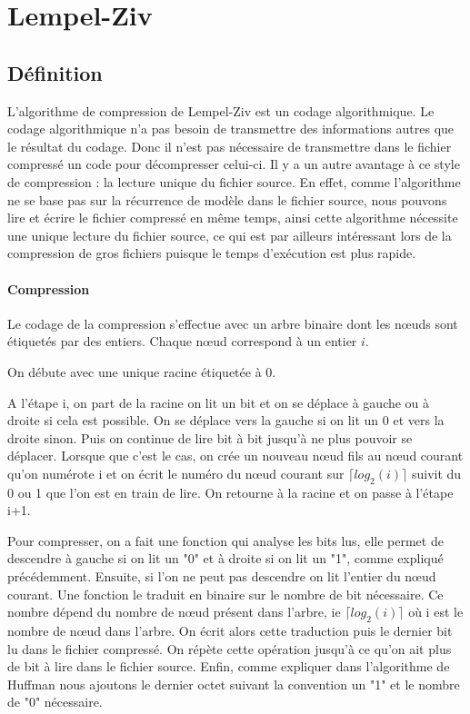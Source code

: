 \documentclass{report}
\begin{document}
\chapter*{Lempel-Ziv}
\section*{Définition }

L'algorithme de compression de Lempel-Ziv est un codage algorithmique.  Le codage algorithmique n’a pas besoin de transmettre des informations autres que le résultat du codage. Donc il n'est pas nécessaire de transmettre dans le fichier compressé un code pour décompresser celui-ci. Il y a un autre avantage à ce style de compression : la lecture unique du fichier source. En effet, comme l'algorithme ne se base pas sur la récurrence de modèle dans le fichier source, nous pouvons lire et écrire le fichier compressé en même temps, ainsi cette algorithme nécessite une unique lecture du fichier source, ce qui est par ailleurs intéressant lors de la compression de gros fichiers puisque le temps d'exécution est plus rapide. 


\subsubsection{Compression}
Le codage de la compression s'effectue avec un arbre binaire dont les nœuds sont étiquetés par des entiers. Chaque nœud correspond à un entier $i$. 

On débute avec une unique racine étiquetée à 0.

A l'étape i, on part de la racine on lit un bit et on se déplace à gauche ou à droite si cela est possible. On se déplace vers la gauche si on lit un 0 et vers la droite sinon. Puis on continue de lire bit à bit jusqu'à ne plus pouvoir se déplacer. Lorsque que c'est le cas, on crée un nouveau nœud fils au nœud courant qu'on numérote i et on écrit le numéro du nœud courant sur $\lceil log_{2}(i) \rceil$ suivit du 0 ou 1 que l'on est en train de lire.
On retourne à la racine et on passe à l'étape i+1.

Pour compresser, on a fait une fonction qui analyse les bits lus, elle permet de descendre à gauche si on lit un "0" et à droite si on lit un "1", comme expliqué précédemment. Ensuite, si l'on ne peut pas descendre on lit l'entier du nœud courant. Une fonction le traduit en binaire sur le nombre de bit nécessaire. Ce nombre dépend du nombre de nœud présent dans l'arbre, ie $\lceil log_{2}(i) \rceil$ où i est le nombre de nœud dans l'arbre. 
On écrit alors cette traduction puis le dernier bit lu dans le fichier compressé. On répète cette opération jusqu'à ce qu'on ait plus de bit  à lire dans le fichier source.
Enfin, comme expliquer dans l'algorithme de Huffman nous ajoutons le dernier octet suivant la convention un "1" et le nombre de "0" nécessaire.  
\end{document}
